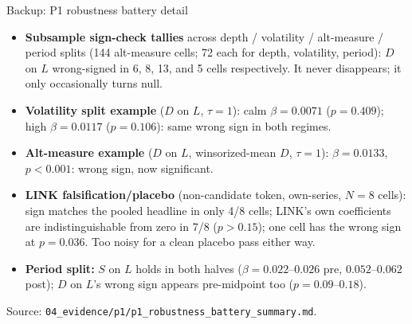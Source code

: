 \documentclass[aspectratio=169]{beamer}
\begin{document}
\begin{frame}{Backup: P1 robustness battery detail}
  \footnotesize
  \begin{itemize}
    \item \textbf{Subsample sign-check tallies} across depth / volatility / alt-measure / period splits (144 alt-measure cells; 72 each for depth, volatility, period): $D$ on $L$ wrong-signed in 6, 8, 13, and 5 cells respectively. It never disappears; it only occasionally turns null.
    \item \textbf{Volatility split example} ($D$ on $L$, $\tau=1$): calm $\beta=0.0071$ ($p=0.409$); high $\beta=0.0117$ ($p=0.106$): same wrong sign in both regimes.
    \item \textbf{Alt-measure example} ($D$ on $L$, winsorized-mean $D$, $\tau=1$): $\beta=0.0133$, $p<0.001$: wrong sign, now significant.
    \item \textbf{LINK falsification/placebo} (non-candidate token, own-series, $N=8$ cells): sign matches the pooled headline in only 4/8 cells; LINK's own coefficients are indistinguishable from zero in 7/8 ($p>0.15$); one cell has the wrong sign at $p=0.036$. Too noisy for a clean placebo pass either way.
    \item \textbf{Period split:} $S$ on $L$ holds in both halves ($\beta=0.022$--$0.026$ pre, $0.052$--$0.062$ post); $D$ on $L$'s wrong sign appears pre-midpoint too ($p=0.09$--$0.18$).
  \end{itemize}
  {\scriptsize Source: \texttt{04\_evidence/p1/p1\_robustness\_battery\_summary.md}.}
\end{frame}
\end{document}
